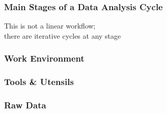 \documentclass[12pt]{beamer}\usepackage[]{graphicx}\usepackage[]{color}
\begin{document}

\begin{frame}
\frametitle{Main Stages of a Data Analysis Cycle}
\begin{center}

\bigskip
{\lit This is not a linear workflow; \\ there are iterative cycles at any stage}
\end{center}
\end{frame}


\begin{frame}[fragile]
\begin{center}
\end{center}
\end{frame}


\begin{frame}
\begin{center}
\Huge{}
\end{center}
\end{frame}


\begin{frame}
\frametitle{Work Environment}
\begin{center}
\end{center}
\end{frame}


\begin{frame}
\frametitle{Tools \& Utensils}
\begin{center}
\end{center}
\end{frame}


\begin{frame}
\frametitle{Raw Data}
\begin{center}
\end{center}
\end{frame}
\end{document}
